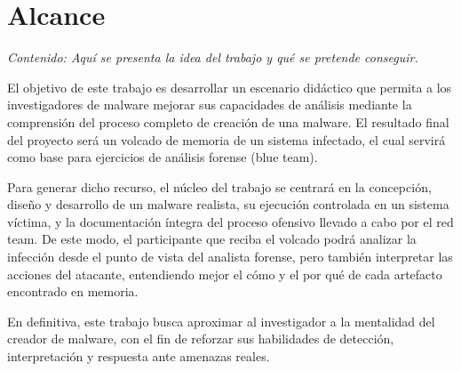 \chapter{Alcance}

\textit{Contenido: Aquí se presenta la idea del trabajo y qué se pretende conseguir.}
\vspace{1em}

El objetivo de este trabajo es desarrollar un escenario didáctico que permita a los
investigadores de malware mejorar sus capacidades de análisis mediante la comprensión
del proceso completo de creación de una malware. El resultado final del proyecto será
un volcado de memoria de un sistema infectado, el cual servirá como base para ejercicios
de análisis forense (blue team).

Para generar dicho recurso, el núcleo del trabajo se centrará en la concepción, diseño y
desarrollo de un malware realista, su ejecución controlada en un sistema víctima, y la
documentación íntegra del proceso ofensivo llevado a cabo por el red team. De este modo,
el participante que reciba el volcado podrá analizar la infección desde el punto de vista
del analista forense, pero también interpretar las acciones del atacante, entendiendo mejor
el cómo y el por qué de cada artefacto encontrado en memoria.

En definitiva, este trabajo busca aproximar al investigador a la mentalidad del creador de
malware, con el fin de reforzar sus habilidades de detección, interpretación y respuesta
ante amenazas reales.